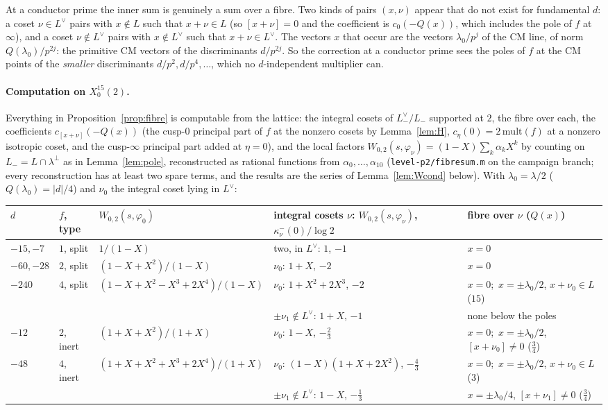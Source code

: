 \documentclass[11pt,reqno]{amsart}
\theoremstyle{plain}
\theoremstyle{definition}
\newcommand{\Ldual}{L^{\vee}}
\newcommand{\Lm}{L_{-}}
\begin{document}
At a conductor prime the inner sum is genuinely a sum over a fibre. Two kinds of pairs $(x,\nu)$
appear that do not exist for fundamental $d$: a coset $\nu\in\Ldual$ pairs with $x\notin L$ such
that $x+\nu\in L$ (so $[x+\nu]=0$ and the coefficient is $c_0(-Q(x))$, which includes the pole of $f$
at $\infty$), and a coset $\nu\notin\Ldual$ pairs with $x\notin\Ldual$ such that $x+\nu\in\Ldual$.
The vectors $x$ that occur are the vectors $\lambda_0/p^j$ of the CM line, of norm
$Q(\lambda_0)/p^{2j}$: the primitive CM vectors of the discriminants $d/p^{2j}$. So the correction
at a conductor prime sees the poles of $f$ at the CM points of the \emph{smaller} discriminants
$d/p^2,d/p^4,\dots$, which no $d$-independent multiplier can.

\paragraph{Computation on $X_0^{15}(2)$.} Everything in Proposition~\ref{prop:fibre} is computable
from the lattice: the integral cosets of $\Lm^\vee/\Lm$ supported at $2$, the fibre over each, the
coefficients $c_{[x+\nu]}(-Q(x))$ (the cusp-$0$ principal part of $f$ at the nonzero cosets by
Lemma~\ref{lem:H}, $c_\eta(0)=2\,\mathrm{mult}(f)$ at a nonzero isotropic coset, and the
cusp-$\infty$ principal part added at $\eta=0$), and the local factors $W_{0,2}(s,\varphi_\nu)=
(1-X)\sum_k\alpha_kX^k$ by counting on $\Lm=L\cap\lambda^\perp$ as in Lemma~\ref{lem:pole},
reconstructed as rational functions from $\alpha_0,\dots,\alpha_{10}$ (\texttt{level-p2/fibresum.m}
on the campaign branch; every reconstruction has at least two spare terms, and the results are the
series of Lemma~\ref{lem:Wcond} below). With $\lambda_0=
\lambda/2$ ($Q(\lambda_0)=\lvert d\rvert/4$) and $\nu_0$ the integral coset lying in $\Ldual$:
\begin{center}\small
\begin{tabular}{lllll}
$d$ & $f$, type & $W_{0,2}(s,\varphi_0)$ & integral cosets $\nu$: $W_{0,2}(s,\varphi_\nu)$, $\kappa^-_\nu(0)/\log2$ & fibre over $\nu$ ($Q(x)$) \\ \hline
$-15,-7$ & $1$, split & $1/(1-X)$ & two, in $\Ldual$: $1$, $-1$ & $x=0$ \\
$-60,-28$ & $2$, split & $(1-X+X^2)/(1-X)$ & $\nu_0$: $1+X$, $-2$ & $x=0$ \\
$-240$ & $4$, split & $(1-X+X^2-X^3+2X^4)/(1-X)$ & $\nu_0$: $1+X^2+2X^3$, $-2$ & $x=0$;\ $x=\pm\lambda_0/2$, $x+\nu_0\in L$ ($15$) \\
 & & & $\pm\nu_1\notin\Ldual$: $1+X$, $-1$ & none below the poles \\
$-12$ & $2$, inert & $(1+X+X^2)/(1+X)$ & $\nu_0$: $1-X$, $-\tfrac23$ & $x=0$;\ $x=\pm\lambda_0/2$, $[x+\nu_0]\ne0$ ($\tfrac34$) \\
$-48$ & $4$, inert & $(1+X+X^2+X^3+2X^4)/(1+X)$ & $\nu_0$: $(1-X)(1+X+2X^2)$, $-\tfrac43$ & $x=0$;\ $x=\pm\lambda_0/2$, $x+\nu_0\in L$ ($3$) \\
 & & & $\pm\nu_1\notin\Ldual$: $1-X$, $-\tfrac13$ & $x=\pm\lambda_0/4$, $[x+\nu_1]\neq0$ ($\tfrac34$) \\
\end{tabular}
\end{center}
\end{document}
